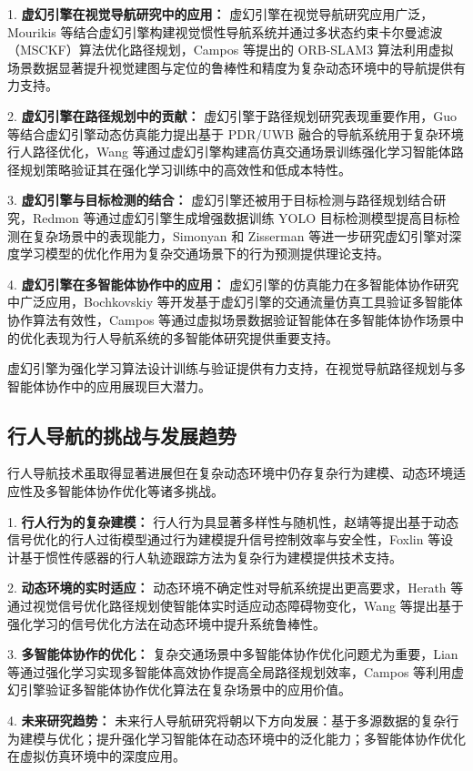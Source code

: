 1. \textbf{虚幻引擎在视觉导航研究中的应用：} 虚幻引擎在视觉导航研究应用广泛，Mourikis 等\cite{mourikis2007msckf}结合虚幻引擎构建视觉惯性导航系统并通过多状态约束卡尔曼滤波（MSCKF）算法优化路径规划，Campos 等\cite{campos2021orbslam3}提出的 ORB-SLAM3 算法利用虚拟场景数据显著提升视觉建图与定位的鲁棒性和精度为复杂动态环境中的导航提供有力支持。

2. \textbf{虚幻引擎在路径规划中的贡献：} 虚幻引擎于路径规划研究表现重要作用，Guo 等\cite{guo2020pdr}结合虚幻引擎动态仿真能力提出基于 PDR/UWB 融合的导航系统用于复杂环境行人路径优化，Wang 等\cite{wang2023llio}通过虚幻引擎构建高仿真交通场景训练强化学习智能体路径规划策略验证其在强化学习训练中的高效性和低成本特性。

3. \textbf{虚幻引擎与目标检测的结合：} 虚幻引擎还被用于目标检测与路径规划结合研究，Redmon 等\cite{redmon2017yolo9000}通过虚幻引擎生成增强数据训练 YOLO 目标检测模型提高目标检测在复杂场景中的表现能力，Simonyan 和 Zisserman 等\cite{simonyan2014action}进一步研究虚幻引擎对深度学习模型的优化作用为复杂交通场景下的行为预测提供理论支持。 

4. \textbf{虚幻引擎在多智能体协作中的应用：} 虚幻引擎的仿真能力在多智能体协作研究中广泛应用，Bochkovskiy 等\cite{bochkovskiy2020yolov4}开发基于虚幻引擎的交通流量仿真工具验证多智能体协作算法有效性，Campos 等\cite{campos2021orbslam3}通过虚拟场景数据验证智能体在多智能体协作场景中的优化表现为行人导航系统的多智能体研究提供重要支持。

虚幻引擎为强化学习算法设计训练与验证提供有力支持，在视觉导航路径规划与多智能体协作中的应用展现巨大潜力。

\subsection{行人导航的挑战与发展趋势}

行人导航技术虽取得显著进展但在复杂动态环境中仍存复杂行为建模、动态环境适应性及多智能体协作优化等诸多挑战。

1. \textbf{行人行为的复杂建模：} 行人行为具显著多样性与随机性，赵靖等\cite{zhao2014crossing}提出基于动态信号优化的行人过街模型通过行为建模提升信号控制效率与安全性，Foxlin 等\cite{foxlin2005tracking}设计基于惯性传感器的行人轨迹跟踪方法为复杂行为建模提供技术支持。

2. \textbf{动态环境的实时适应：} 动态环境不确定性对导航系统提出更高要求，Herath 等\cite{herath2020ronin}通过视觉信号优化路径规划使智能体实时适应动态障碍物变化，Wang 等\cite{wang2013densetrajectory}提出基于强化学习的信号优化方法在动态环境中提升系统鲁棒性。

3. \textbf{多智能体协作的优化：} 复杂交通场景中多智能体协作优化问题尤为重要，Lian 等\cite{lian2023inverseql}通过强化学习实现多智能体高效协作提高全局路径规划效率，Campos 等\cite{campos2021orbslam3}利用虚幻引擎验证多智能体协作优化算法在复杂场景中的应用价值。

4. \textbf{未来研究趋势：} 未来行人导航研究将朝以下方向发展：基于多源数据的复杂行为建模与优化；提升强化学习智能体在动态环境中的泛化能力；多智能体协作优化在虚拟仿真环境中的深度应用。
